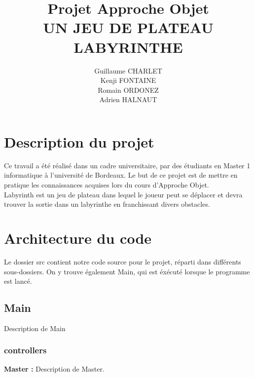 \documentclass[a4paper]{article}
\title
{
	\LARGE{Projet Approche Objet}
	\HRule \\ [0.5cm]
	\LARGE \textbf{\uppercase{Un jeu de plateau Labyrinthe}}
	\HRule \\ [0.5cm]
}
\author{Guillaume CHARLET \\ Kenji FONTAINE \\ Romain ORDONEZ \\ Adrien HALNAUT}
\begin{document}
\null  %
\nointerlineskip  %
\vfill
\let\snewpage \newpage
\let\newpage \relax
\maketitle
\let \newpage \snewpage
\vfill
\break %


\tableofcontents
\newpage


\section{Description du projet}
Ce travail a été réalisé dans un cadre universitaire,  par des étudiants en
Master 1 informatique à l'université de Bordeaux.
Le but de ce projet est de mettre en pratique les connaissances acquises lors
du cours d'Approche Objet. \\
Labyrinth est un jeu de plateau dans lequel le joueur peut se déplacer et devra
trouver la sortie dans un labyrinthe en franchissant divers obstacles.


\section{Architecture du code}

Le dossier src contient notre code source pour le projet, réparti dans
différents sous-dossiers. On y trouve également Main, qui est éxécuté lorsque
le programme est lancé.

\subsection{Main}
Description de Main

\subsubsection{controllers}
\textbf{Master :} Description de Master.
\end{document}
